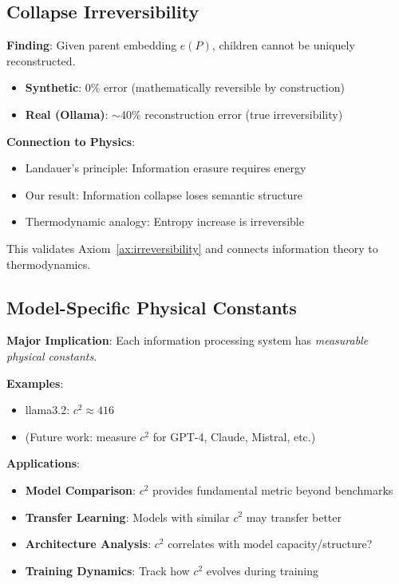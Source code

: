 \documentclass[11pt,a4paper]{article}
\begin{document}
\subsection{Collapse Irreversibility}

\textbf{Finding}: Given parent embedding $e(P)$, children cannot be uniquely reconstructed.

\begin{itemize}
    \item \textbf{Synthetic}: 0\% error (mathematically reversible by construction)
    \item \textbf{Real (Ollama)}: $\sim$40\% reconstruction error (true irreversibility)
\end{itemize}

\textbf{Connection to Physics}:
\begin{itemize}
    \item Landauer's principle: Information erasure requires energy
    \item Our result: Information collapse loses semantic structure
    \item Thermodynamic analogy: Entropy increase is irreversible
\end{itemize}

This validates Axiom~\ref{ax:irreversibility} and connects information theory to thermodynamics.

\subsection{Model-Specific Physical Constants}

\textbf{Major Implication}: Each information processing system has \emph{measurable physical constants}.

\textbf{Examples}:
\begin{itemize}
    \item llama3.2: $c^2 \approx 416$
    \item (Future work: measure $c^2$ for GPT-4, Claude, Mistral, etc.)
\end{itemize}

\textbf{Applications}:
\begin{itemize}
    \item \textbf{Model Comparison}: $c^2$ provides fundamental metric beyond benchmarks
    \item \textbf{Transfer Learning}: Models with similar $c^2$ may transfer better
    \item \textbf{Architecture Analysis}: $c^2$ correlates with model capacity/structure?
    \item \textbf{Training Dynamics}: Track how $c^2$ evolves during training
\end{itemize}
\end{document}
